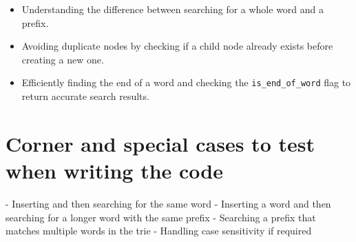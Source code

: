 \begin{itemize}
    \item Understanding the difference between searching for a whole word and a prefix.
    \item Avoiding duplicate nodes by checking if a child node already exists before creating a new one.
    \item Efficiently finding the end of a word and checking the \texttt{is\_end\_of\_word} flag to return accurate search results.
\end{itemize}


\section*{Corner and special cases to test when writing the code}

- Inserting and then searching for the same word
- Inserting a word and then searching for a longer word with the same prefix
- Searching a prefix that matches multiple words in the trie
- Handling case sensitivity if required